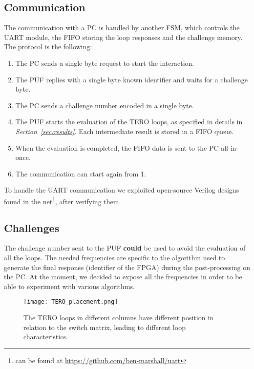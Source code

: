 \subsection{Communication}
The communication with a PC is handled by another FSM, which controls the UART module, 
the FIFO storing the loop responses and the challenge memory. \\
The protocol is the following:
\begin{enumerate}
    \item The PC sends a single byte request to start the interaction.
    \item The PUF replies with a single byte known identifier and waits for a challenge byte.
    \item The PC sends a challenge number encoded in a single byte.
    \item The PUF starts the evaluation of the TERO loops, as specified in details in \textit{Section~\ref{sec:results}}. 
          Each intermediate result is stored in a FIFO queue.
    \item When the evaluation is completed, the FIFO data is sent to the PC all-in-once.
    \item The communication can start again from 1.
\end{enumerate}
To handle the UART communication we exploited open-source Verilog designs found in the
net\footnote{can be found at \href{https://github.com/ben-marshall/uart}{\color{bluePoli}https://github.com/ben-marshall/uart}}, after verifying them.

\subsection{Challenges}
The challenge number sent to the PUF \textbf{could} be used to avoid the evaluation of all the loops.
The needed frequencies are specific to the algorithm used to generate the final response 
(identifier of the FPGA) during the post-processing on the PC. 
At the moment, we decided to expose all the frequencies in order to be able to experiment 
with various algorithms. 

\begin{figure}[H]
    \centering
    \texttt{[image: TERO\_placement.png]}
    \caption{The TERO loops in different columns have different position in relation to the switch matrix, leading to different loop characteristics.}
    \label{img:TERO_PLACEMENT}
\end{figure}
